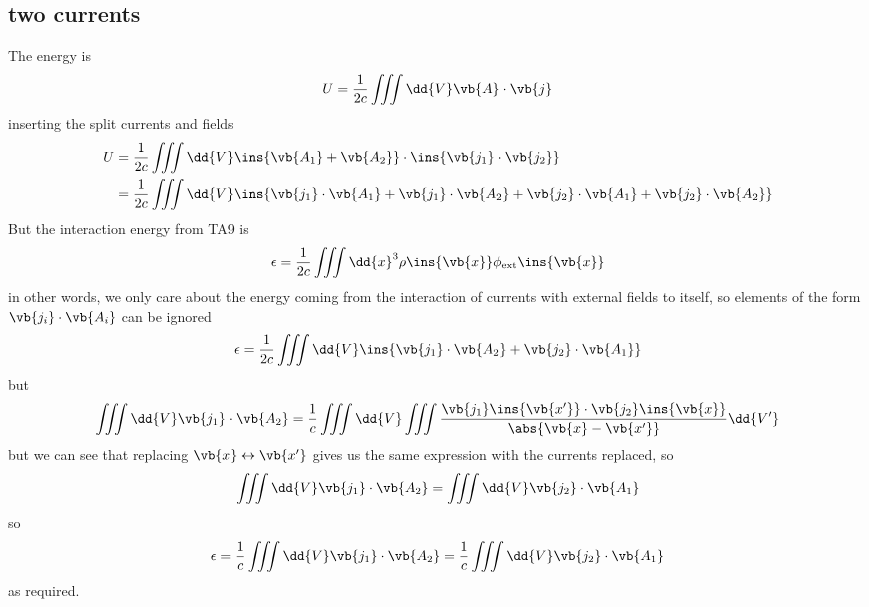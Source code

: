 \subsection{two currents}
The energy is
\begin{equation}
	U=\frac{1}{2c}\iiint\dd{V}\vb{A}\cdot\vb{j}
\end{equation}
inserting the split currents and fields
\begin{align}
	U&=\frac{1}{2c}\iiint\dd{V}\ins{\vb{A_1}+\vb{A_2}}\cdot\ins{\vb{j_1}\cdot\vb{j_2}}\\
	&= \frac{1}{2c}\iiint\dd{V}\ins{\vb{j_1}\cdot\vb{A_1}+\vb{j_1}\cdot\vb{A_2}+\vb{j_2}\cdot\vb{A_1}+\vb{j_2}\cdot\vb{A_2}}
\end{align}
But the interaction energy from TA9 is 
\begin{equation}
	\epsilon = \frac{1}{2c}\iiint \dd{x}^3\rho\ins{\vb{x}}\phi_{\text{ext}}\ins{\vb{x}}
\end{equation}
in other words, we only care about the energy coming from the interaction of currents with external fields to itself, so elements of the form \(\vb{j_i}\cdot\vb{A_i}\) can be ignored
\begin{equation}
	\epsilon = \frac{1}{2c}\iiint\dd{V}\ins{\vb{j_1}\cdot\vb{A_2}+\vb{j_2}\cdot\vb{A_1}}
\end{equation}
but 
\begin{equation}
	\iiint\dd{V}\vb{j_1}\cdot\vb{A_2}=\frac{1}{c}\iiint\dd{V}\iiint\frac{\vb{j_1}\ins{\vb{x'}}\cdot\vb{j_2}\ins{\vb{x}}}{\abs{\vb{x}-\vb{x'}}}\dd{V'}
\end{equation}
but we can see that replacing \(\vb{x}\leftrightarrow\vb{x'}\) gives us the same expression with the currents replaced, so 
\begin{equation}
	\iiint\dd{V}\vb{j_1}\cdot\vb{A_2} = \iiint\dd{V}\vb{j_2}\cdot\vb{A_1}
\end{equation}
so 
\begin{equation}
	\epsilon=\frac{1}{c}\iiint\dd{V}\vb{j_1}\cdot\vb{A_2}=\frac{1}{c}\iiint\dd{V}\vb{j_2}\cdot\vb{A_1}
\end{equation}
as required.
